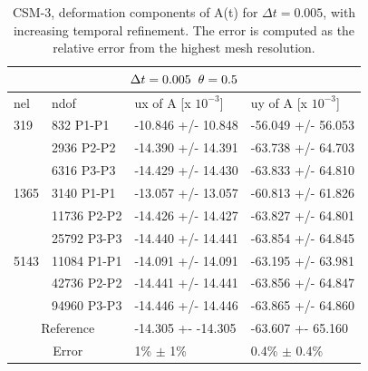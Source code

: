 \begin{table}[h!]
\centering
\begin{tabular}{ |p{1cm}||p{2.7cm}|p{3.3cm}|p{3.3cm}|}
\hline
  \multicolumn{4}{|c|}{$\Delta t = 0.005 \hspace{2mm} \theta = 0.5$} \\
\hline
nel & ndof & ux of A [x $10^{-3}$]  &uy of A [x $10^{-3}$] \\
\hline
    319     & 832 P1-P1 & -10.846       +/-  10.848 & -56.049       +/-  56.053 \\
     & 2936 P2-P2  & -14.390       +/-  14.391 & -63.738       +/-  64.703 \\
      & 6316 P3-P3 & -14.429       +/-  14.430 & -63.833       +/-  64.810 \\
 \hline 
    1365    & 3140 P1-P1 & -13.057       +/-  13.057 & -60.813       +/-  61.826 \\
     & 11736 P2-P2& -14.426       +/-  14.427 & -63.827       +/-  64.801 \\
     & 25792 P3-P3 & -14.440       +/-  14.441 & -63.854       +/-  64.845 \\
 \hline
      5143    & 11084 P1-P1 & -14.091       +/-  14.091 & -63.195       +/-  63.981 \\
     & 42736 P2-P2 & -14.441       +/-  14.441 & -63.856       +/-  64.847 \\
     & 94960 P3-P3 & -14.446       +/-  14.446 & -63.865       +/-  64.860 \\
 \hline
  \multicolumn{2}{|c|}{Reference}  &-14.305 +- -14.305        & -63.607 +- 65.160    \\
   \hline
    \multicolumn{2}{|c|}{Error}  & 1\% $\pm$ 1\% &  0.4\% $\pm$ 0.4\%  \\
   \hline
\end{tabular}
\caption{CSM-3, deformation components of A(t) for $\Delta t = 0.005$, with increasing temporal refinement. The error is computed as the relative error from the highest mesh resolution.}
\label{table:csm32}
\end{table}
\newpage

